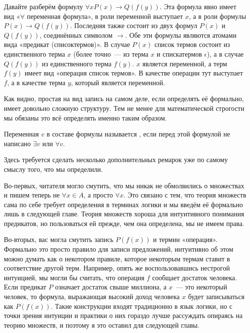 \begin{example}
Давайте разберём формулу $\forall x P(x) \to Q(f(y))$. Эта формула явно имеет вид «$\forall$ переменная формула», в роли переменной выступает $x$, а в роли формулы $P(x) \to Q(f(y))$. Последняя также состоит из двух формул $P(x)$ и $Q(f(y))$, соединённых символом $\to$. Обе эти формулы являются атомами вида «предикат (списоктермов)». В случае $P(x)$ список термов состоит из единственного терма $x$ (более точно~— из терма $x$ и спискатермов $\epsilon$), а в случае $Q(f(y))$ из единственного терма $f(y)$. $x$ является переменной, а терм $f(y)$ имеет вид «операция список термов». В качестве операции тут выступает $f$, а в качестве терма $y$, который является переменной.
\end{example}

Как видно, простая на вид запись на самом деле, если определять её формально, имеет довольно сложную структуру. Тем не менее для математической строгости мы обязаны это всё определять именно таким образом.

\begin{definition}
Переменная $v$ в составе формулы называется , если перед этой формулой не написано $\exists v$ или $\forall v$.
\end{definition}

Здесь требуется сделать несколько дополнительных ремарок уже по самому смыслу того, что мы определили.

Во-первых, читателя могло смутить, что мы никак не обмолвились о множествах и пишем теперь не $\forall x\in A$, а просто $\forall x$. Это связано с тем, что теория множеств сама по себе требует определения в терминах логики и мы введём её формально лишь в следующей главе. Теория множеств хороша для интуитивного понимания предикатов, но пользоваться ей прежде, чем она определена, мы не имеем права.

Во-вторых, вас могла смутить запись $P(f(x))$ и термин «операция». Формально это просто правило для записи предложений, интуитивно об этом можно думать как о некотором правиле, которое некоторым термам ставит в соответствие другой терм. Например, опять же воспользовавшись нестрогой интуицией, мы могли бы считать, что операция $f$ сообщает достаток человека. Если предикат $P$ означает достаток свыше миллиона, а $x$~— это некоторый человек, то формула, выражающая высокий доход человека $x$ будет записываться как $P(f(x))$. Такие конструкции входят традиционно в язык логики, но с точки зрения интуиции и практики о них гораздо лучше рассуждать опираясь на теорию множеств, и поэтому я это оставил для следующей главы.

